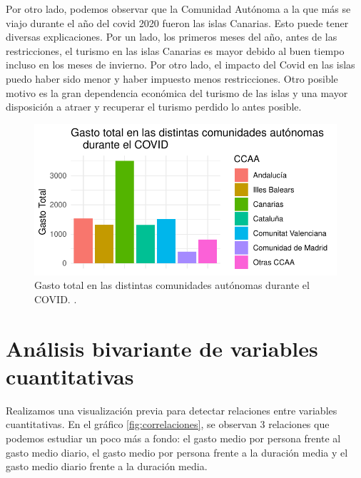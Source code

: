 \documentclass[data,article,submit,moreauthors,pdftex]{Definitions/mdpi}
\begin{document}
Por otro lado, podemos observar que la Comunidad Autónoma a la que más
se viajo durante el año del covid 2020 fueron las islas Canarias. Esto
puede tener diversas explicaciones. Por un lado, los primeros meses del
año, antes de las restricciones, el turismo en las islas Canarias es
mayor debido al buen tiempo incluso en los meses de invierno. Por otro
lado, el impacto del Covid en las islas puedo haber sido menor y haber
impuesto menos restricciones. Otro posible motivo es la gran dependencia
económica del turismo de las islas y una mayor disposición a atraer y
recuperar el turismo perdido lo antes posible.

\begin{figure}[H]
\includegraphics{ProyectoAED2024_Rmd_files/figure-latex/gasto comunidades covid-1} \caption{Gasto total en las distintas comunidades autónomas durante el COVID. .\label{fig:gastototalporCCAAcovid}}\label{fig:gasto comunidades covid}
\end{figure}

\hypertarget{anuxe1lisis-bivariante-de-variables-cuantitativas}{%
\section{Análisis bivariante de variables
cuantitativas}\label{anuxe1lisis-bivariante-de-variables-cuantitativas}}

Realizamos una visualización previa para detectar relaciones entre
variables cuantitativas. En el gráfico \ref{fig:correlaciones}, se
observan 3 relaciones que podemos estudiar un poco más a fondo: el gasto
medio por persona frente al gasto medio diario, el gasto medio por
persona frente a la duración media y el gasto medio diario frente a la
duración media.
\end{document}
